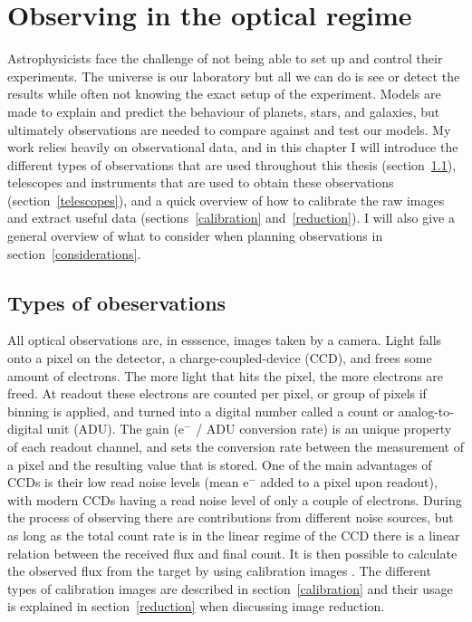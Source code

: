 \documentclass[a4paper,oneside,12pt, class=Latex/Classes/PhDthesisPSnPDF, crop=false]{standalone}
\begin{document}
\doublespacing
\chapter{Observing in the optical regime}
\label{chap:obs}


Astrophysicists face the challenge of not being able to set up and control their experiments. The universe is our laboratory but all we can do is see or detect the results while often not knowing the exact setup of the experiment. Models are made to explain and predict the behaviour of planets, stars, and galaxies, but ultimately observations are needed to compare against and test our models. My work relies heavily on observational data, and in this chapter I will introduce the different types of observations that are used throughout this thesis (section~\ref{observation_types}), telescopes and instruments that are used to obtain these observations (section~\ref{telescopes}), and a quick overview of how to calibrate the raw images and extract useful data (sections~\ref{calibration} and~\ref{reduction}). I will also give a general overview of what to consider when planning observations in section~\ref{considerations}.


\section{Types of obeservations}
\label{observation_types}
All optical observations are, in esssence, images taken by a camera. Light falls onto a pixel on the detector, a charge-coupled-device (CCD), and frees some amount of electrons. The more light that hits the pixel, the more electrons are freed. At readout these electrons are counted per pixel, or group of pixels if binning is applied, and turned into a digital number called a count or analog-to-digital unit (ADU). The gain (e$^-$ / ADU conversion rate) is an unique property of each readout channel, and sets the conversion rate between the measurement of a pixel and the resulting value that is stored. One of the main advantages of CCDs is their low read noise levels (mean e$^-$ added to a pixel upon readout), with modern CCDs having a read noise level of only a couple of electrons. During the process of observing there are contributions from different noise sources, but as long as the total count rate is in the linear regime of the CCD there is a linear relation between the received flux and final count. It is then possible to calculate the observed flux from the target by using calibration images \citep{CCD_handbook}. The different types of calibration images are described in section~\ref{calibration} and their usage is explained in section~\ref{reduction} when discussing image reduction.
\end{document}
